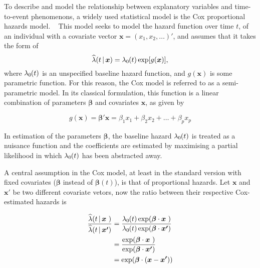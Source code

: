 To describe and model the relationship between explanatory variables
and time-to-event phenomenons, a widely used statistical model is 
the Cox proportional hazards model. 
~\autocite{coxRegression1972}
This model seeks to model the hazard function over time \(t\),
of an individual with a covariate vector \(\bm{x} = (x_1, x_2, \dots)'\),
and assumes that it takes the form of
%
\begin{equation}
    \label{eq:cox}
    \widehat{\lambda} (t \,|\, \bm{x}) = \hzt \exp [g(\bm{x})],
\end{equation}
%
where \(\lambda_0\mspace{-1mu}(t)\)
is an unspecified baseline hazard function,
and \(g(\bm{x})\) is some parametric function.
For this reason, the Cox model 
is referred to as a semi-parametric model.
In its classical formulation, 
this function is a linear combination of parameters 
\(\bm{\beta}\) and covariates \(\bm{x}\),
as given by

\begin{equation}
    g(\bm{x}) 
    = \bm{\beta}' \bm{x} 
    = \beta_1 x_1 + \beta_2 x_2 + \ldots + \beta_p x_p
\end{equation}

In estimation of the parameters \(\bm{\beta}\),
the baseline hazard \(\lambda_0\mspace{-1mu}(t)\) is treated as a nuisance function
and the coefficients are estimated by
maximising a partial likelihood
in which \(\lambda_0\mspace{-1mu}(t)\) has been abstracted away.
~\autocite{kalbfleischStatistical2002}

A central assumption in the Cox model, 
at least in the standard version with fixed covariates
(\(\bm{\beta}\) instead of \(\bm{\beta}(t)\)),
is that of proportional hazards.
Let \(\bm{x}\) and \(\bm{x}'\) be two different 
covariate vetors, now the ratio between their
respective Cox-estimated hazards is

\begin{equation}
    \label{eq:hazard-ratio}
    \begin{aligned}
    \frac%
        {\widehat{\lambda}(t \,|\, \bm{x} \hfill)}%
        {\widehat{\lambda}(t \,|\, \bm{x'})}
    &=
    \frac%
        {\hzt \exp (\bm{\beta}\cdot\bm{x}\hfill)}%
        {\hzt \exp (\bm{\beta}\cdot\bm{x'})} \\
    &=
    \frac%
        {\exp (\bm{\beta}\cdot\bm{x}\hfill)}%
        {\exp (\bm{\beta}\cdot\bm{x'})} \\
    &= \exp (\bm{\beta} \cdot (\bm{x} - \bm{x'}))
    \end{aligned}
\end{equation}

